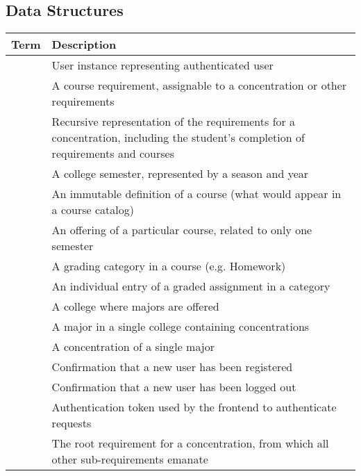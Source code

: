 \documentclass[12pt]{article}
\newenvironment{dictionary}[1]
{
    \subsection{#1}
    \begin{table}[H]
    \begin{tabular}{ | m{\dimexpr.45\linewidth-1\tabcolsep-1.3333\arrayrulewidth}
                     | m{\dimexpr.55\linewidth-1\tabcolsep-1.3333\arrayrulewidth} | }
    \hline
    \textbf{Term} & \textbf{Description} \\ \hline
}
{
    \end{tabular}
    \end{table}
}
\newcommand{\dictitem}[2]{\detokenize{#1} & #2 \\ \hline}
\begin{document}
\begin{dictionary}{Data Structures}
    \dictitem{user}{User instance representing authenticated user}
    \dictitem{requirement}{A course requirement, assignable to a concentration or other
    requirements}
    \dictitem{requirement_structure}{Recursive representation of the requirements for a
    concentration, including the student's completion of requirements and courses}
    \dictitem{semester}{A college semester, represented by a season and year}
    \dictitem{course}{An immutable definition of a course (what would appear in a course catalog)}
    \dictitem{course_instance}{An offering of a particular course, related to only one semester}
    \dictitem{category}{A grading category in a course (e.g. Homework)}
    \dictitem{grade_entry}{An individual entry of a graded assignment in a category}
    \dictitem{college}{A college where majors are offered}
    \dictitem{major}{A major in a single college containing concentrations}
    \dictitem{concentration}{A concentration of a single major}
    \dictitem{registration_confirmation}{Confirmation that a new user has been registered}
    \dictitem{logout_confirmation}{Confirmation that a new user has been logged out}
    \dictitem{auth_token}{Authentication token used by the frontend to authenticate requests}
    \dictitem{root_requirement}{The root requirement for a concentration, from which all other
    sub-requirements emanate}
\end{dictionary}

\end{document}
